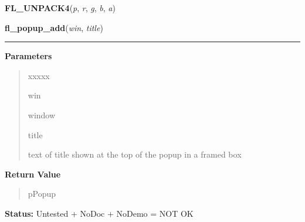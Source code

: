     \label{xformslib:library:FL_UNPACK4}

    \vspace{0.5ex}

\hspace{.8\funcindent}\begin{boxedminipage}{\funcwidth}

    \raggedright \textbf{FL\_UNPACK4}(\textit{p}, \textit{r}, \textit{g}, \textit{b}, \textit{a})

\setlength{\parskip}{2ex}
\setlength{\parskip}{1ex}
    \end{boxedminipage}

    \label{xformslib:library:fl_popup_add}

    \vspace{0.5ex}

\hspace{.8\funcindent}\begin{boxedminipage}{\funcwidth}

    \raggedright \textbf{fl\_popup\_add}(\textit{win}, \textit{title})

    \vspace{-1.5ex}

    \rule{\textwidth}{0.5\fboxrule}
\setlength{\parskip}{2ex}
\setlength{\parskip}{1ex}
      \textbf{Parameters}
      \vspace{-1ex}

      \begin{quote}
        \begin{Ventry}{xxxxx}

          \item[win]

          window

          \item[title]

          text of title shown at the top of the popup in a framed box

        \end{Ventry}

      \end{quote}

      \textbf{Return Value}
    \vspace{-1ex}

      \begin{quote}
      pPopup

      \end{quote}

\textbf{Status:} Untested + NoDoc + NoDemo = NOT OK



    \end{boxedminipage}

